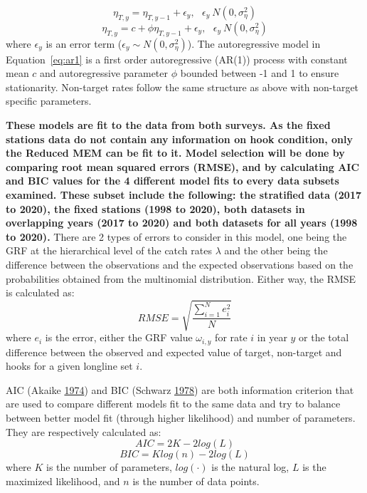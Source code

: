 \documentclass[12pt]{article}\usepackage[]{graphicx}\usepackage[]{color}
\begin{document}
\begin{equation}\label{eq:rand-walk}
\eta_{T,y} = \eta_{T,y-1} + \epsilon_y, \ \ \ \epsilon_y ~ N(0,\sigma_\eta^2)
\end{equation} \begin{equation}\label{eq:ar1}
\eta_{T,y} = c + \phi \eta_{T,y-1} + \epsilon_y, \ \ \ \epsilon_y ~ N(0,\sigma_\eta^2)
\end{equation}
where \(\epsilon_y\) is an error term (\(\epsilon_y \sim N(0,\sigma_\eta^2)\)). The autoregressive model in Equation~\ref{eq:ar1} is a first order autoregressive (AR(1)) process with constant mean \(c\) and autoregressive parameter \(\phi\) bounded between -1 and 1 to ensure stationarity. Non-target rates follow the same structure as above with non-target specific parameters.

\textbf{These models are fit to the data from both surveys. As the fixed stations data do not contain any information on hook condition, only the Reduced MEM can be fit to it. Model selection will be done by comparing root mean squared errors (RMSE), and by calculating AIC and BIC values for the 4 different model fits to every data subsets examined. These subset include the following: the stratified data (2017 to 2020), the fixed stations (1998 to 2020), both datasets in overlapping years (2017 to 2020) and both datasets for all years (1998 to 2020).} There are 2 types of errors to consider in this model, one being the GRF at the hierarchical level of the catch rates \(\lambda\) and the other being the difference between the observations and the expected observations based on the probabilities obtained from the multinomial distribution. Either way, the RMSE is calculated as:
\begin{equation}
RMSE = \sqrt{\frac{\sum_{i=1}^N e_i^2}{N}}
\end{equation}
where \(e_i\) is the error, either the GRF value \(\omega_{i,y}\) for rate \(i\) in year \(y\) or the total difference between the observed and expected value of target, non-target and hooks for a given longline set \(i\).

AIC (Akaike \protect\hyperlink{ref-Akaike1974}{1974}) and BIC (Schwarz \protect\hyperlink{ref-Schwarz1978}{1978}) are both information criterion that are used to compare different models fit to the same data and try to balance between better model fit (through higher likelihood) and number of parameters. They are respectively calculated as:
\begin{equation}\label{eq:aic}
AIC = 2K - 2 log(L)
\end{equation} \begin{equation}\label{eq:bic}
BIC = K log(n) - 2 log(L)
\end{equation}
where \(K\) is the number of parameters, \(log(\cdot)\) is the natural log, \(L\) is the maximized likelihood, and \(n\) is the number of data points.
\end{document}
